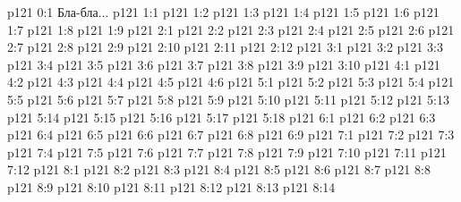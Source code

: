 \author{Промежуточные создания}
\vs p121 0:1  Бла-бла...
\vs p121 1:1 
\vs p121 1:2 
\vs p121 1:3 
\vs p121 1:4 
\vs p121 1:5 
\vs p121 1:6 
\vs p121 1:7 \pc 
\vs p121 1:8 
\vs p121 1:9 
\vs p121 2:1 
\vs p121 2:2 
\vs p121 2:3 
\vs p121 2:4 
\vs p121 2:5 
\vs p121 2:6 
\vs p121 2:7 \pc 
\vs p121 2:8 
\vs p121 2:9 \pc 
\vs p121 2:10 
\vs p121 2:11 
\vs p121 2:12 
\vs p121 3:1 
\vs p121 3:2 
\vs p121 3:3 
\vs p121 3:4 
\vs p121 3:5 
\vs p121 3:6 
\vs p121 3:7 
\vs p121 3:8 
\vs p121 3:9 \pc 
\vs p121 3:10 
\vs p121 4:1 
\vs p121 4:2 
\vs p121 4:3 
\vs p121 4:4 
\vs p121 4:5 
\vs p121 4:6 \pc 
{}
\vs p121 5:1 
\vs p121 5:2 
\vs p121 5:3 
\vs p121 5:4 
\vs p121 5:5 
\vs p121 5:6 
\vs p121 5:7 \pc 
\vs p121 5:8 
\vs p121 5:9 
\vs p121 5:10 
\vs p121 5:11 
\vs p121 5:12 \pc 
\vs p121 5:13 
\vs p121 5:14 
\vs p121 5:15 
\vs p121 5:16 
\vs p121 5:17 \pc 
\vs p121 5:18 
\vs p121 6:1 
\vs p121 6:2 
\vs p121 6:3 
\vs p121 6:4 
\vs p121 6:5 
\vs p121 6:6 
\vs p121 6:7 \pc 
\vs p121 6:8 
\vs p121 6:9 
\vs p121 7:1 
\vs p121 7:2 
\vs p121 7:3 
\vs p121 7:4 
\vs p121 7:5 
\vs p121 7:6 
\vs p121 7:7 \pc 
\vs p121 7:8 
\vs p121 7:9 
\vs p121 7:10 
\vs p121 7:11 
\vs p121 7:12 \pc 
{}
\vs p121 8:1 
\vs p121 8:2 
\vs p121 8:3 
\vs p121 8:4 
\vs p121 8:5 
\vs p121 8:6 
\vs p121 8:7 
\vs p121 8:8 
\vs p121 8:9 
\vs p121 8:10 
\vs p121 8:11 \pc 
\vsetoff
\vs p121 8:12 
\vs p121 8:13 
\vs p121 8:14 
\quizlink
